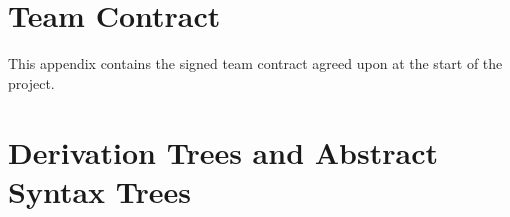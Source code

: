 \documentclass{tum_report}
\begin{document}
    
    \clearpage

     
    \clearpage

    \tableofcontents
    \thispagestyle{empty}
    \clearpage

    
    \clearpage

    
    \clearpage

    
    \clearpage

    
    \clearpage

    
    \clearpage
    

    \nocite{*} 


    \clearpage
    \appendix
    

    \chapter{Team Contract} 
    \label{appendix:contract}
    This appendix contains the signed team contract agreed upon at the 
    start of the project.
    

    

    

    \chapter{Derivation Trees and Abstract Syntax Trees} 
    \label{appendix:asts}
    
\end{document}
